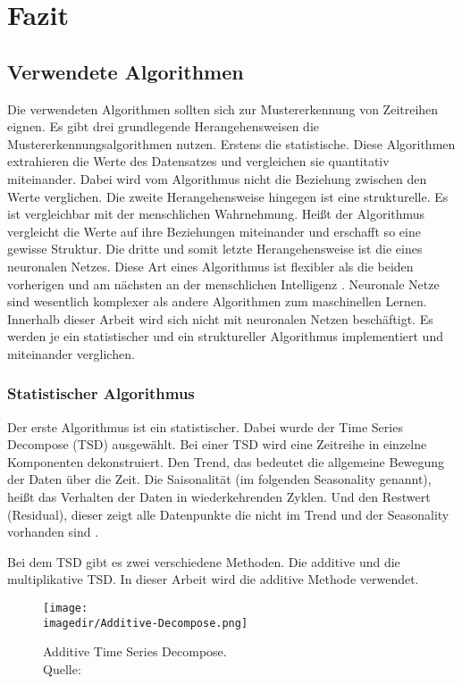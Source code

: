 \chapter{Fazit}

\section{Verwendete Algorithmen}
Die verwendeten Algorithmen sollten sich zur Mustererkennung von Zeitreihen eignen. Es gibt drei grundlegende Herangehensweisen die Mustererkennungsalgorithmen nutzen. Erstens die statistische. Diese Algorithmen extrahieren die Werte des Datensatzes und vergleichen sie quantitativ miteinander. Dabei wird vom Algorithmus nicht die Beziehung zwischen den Werte verglichen. Die zweite Herangehensweise hingegen ist eine strukturelle. Es ist vergleichbar mit der menschlichen Wahrnehmung. Heißt der Algorithmus vergleicht die Werte auf ihre Beziehungen miteinander und erschafft so eine gewisse Struktur. Die dritte und somit letzte Herangehensweise ist die eines neuronalen Netzes. Diese Art eines Algorithmus ist flexibler als die beiden vorherigen und am nächsten an der menschlichen Intelligenz \autocite[Vgl.][]{.07022021}. Neuronale Netze sind wesentlich komplexer als andere Algorithmen zum maschinellen Lernen. Innerhalb dieser Arbeit wird sich nicht mit neuronalen Netzen beschäftigt. Es werden je ein statistischer und ein struktureller Algorithmus implementiert und miteinander verglichen.

\subsection{Statistischer Algorithmus}

Der erste Algorithmus ist ein statistischer. Dabei wurde der Time Series Decompose (TSD) ausgewählt. Bei einer TSD wird eine Zeitreihe in einzelne Komponenten dekonstruiert. Den Trend, das bedeutet die allgemeine Bewegung der Daten über die Zeit. Die Saisonalität (im folgenden Seasonality genannt), heißt das Verhalten der Daten in wiederkehrenden Zyklen. Und den Restwert (Residual), dieser zeigt alle Datenpunkte die nicht im Trend und der Seasonality vorhanden sind \autocite[Vgl.][]{Radecic.15.7.2021}.

Bei dem TSD gibt es zwei verschiedene Methoden. Die additive und die multiplikative TSD. In dieser Arbeit wird die additive Methode verwendet.

\begin{figure}[H]

	\centering
	\texttt{[image: \\imagedir/Additive-Decompose.png]}
	\captionsetup{format=hang}
	\caption[Additive Time Series Decompose]{\label{fig:test}Additive Time Series Decompose. \\Quelle:
	\autocite{Radecic.15.7.2021}}

\end{figure}

